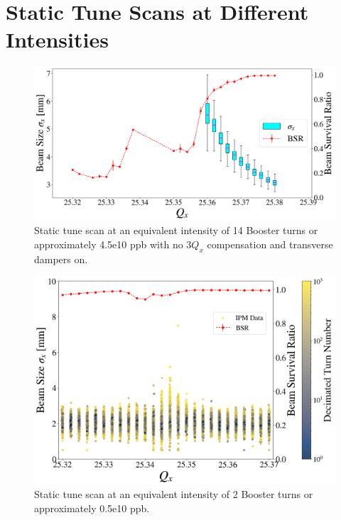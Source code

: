 \section{\label{sec:ch6sts}Static Tune Scans at Different Intensities}

\begin{figure}[H]
    \centering
    \includegraphics[width=\columnwidth]{chapter6/static14turns_BARE_dampersON.png}
    \caption{Static tune scan at an equivalent intensity of 14 Booster turns or approximately 4.5e10 ppb with no $3Q_x$ compensation and transverse dampers on.}
    \label{fig:static14_bare}
\end{figure}

\begin{figure}[H]
    \centering
    \includegraphics[width=\columnwidth]{chapter6/static2turns_dampersOFF.png}
    \caption{Static tune scan at an equivalent intensity of 2 Booster turns or approximately 0.5e10 ppb.}
    \label{fig:static2_scatter}
\end{figure}

